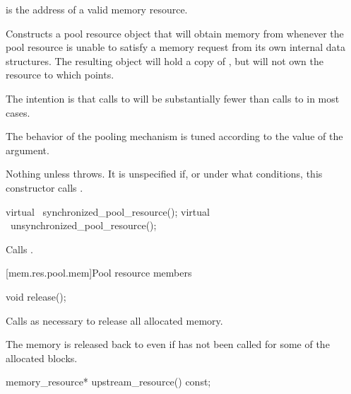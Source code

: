 \begin{itemdescr}
\pnum
\requires
{} is the address of a valid memory resource.

\pnum
\effects
Constructs a pool resource object that will obtain memory from 
whenever the pool resource is unable to satisfy a memory request
from its own internal data structures.
The resulting object will hold a copy of ,
but will not own the resource to which  points.
\begin{note}
The intention is that calls to 
will be substantially fewer than calls to 
in most cases.\end{note}
The behavior of the pooling mechanism is tuned
according to the value of the  argument.

\pnum
\throws
Nothing unless  throws.
It is unspecified if, or under what conditions,
this constructor calls .
\end{itemdescr}

%
%
\begin{itemdecl}
virtual ~synchronized_pool_resource();
virtual ~unsynchronized_pool_resource();
\end{itemdecl}

\begin{itemdescr}
\pnum
\effects
Calls .
\end{itemdescr}

[mem.res.pool.mem]{Pool resource members}

%
%
\begin{itemdecl}
void release();
\end{itemdecl}

\begin{itemdescr}
\pnum
\effects
Calls  as necessary
to release all allocated memory.
\begin{note}
The memory is released back to 
even if  has not been called
for some of the allocated blocks.\end{note}
\end{itemdescr}

%
%
\begin{itemdecl}
memory_resource* upstream_resource() const;
\end{itemdecl}

